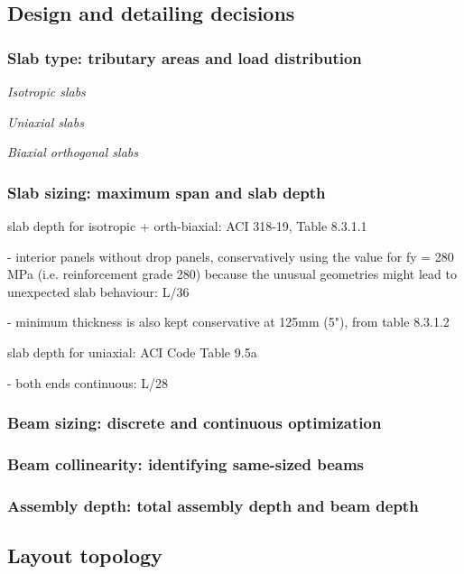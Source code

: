 \documentclass[10pt, letterpaper]{article} %
\begin{document}
    \subsection{Design and detailing decisions}\label{sec:design-decisions}

    \subsubsection{Slab type: tributary areas and load distribution}

    \textit{Isotropic slabs}

    \textit{Uniaxial slabs}

    \textit{Biaxial orthogonal slabs}

    \subsubsection{Slab sizing: maximum span and slab depth}

    slab depth for isotropic + orth-biaxial: ACI 318-19, Table 8.3.1.1
    
    - interior panels without drop panels, conservatively using the value for fy = 280 MPa (i.e. reinforcement grade 280) because the unusual geometries might lead to unexpected slab behaviour: L/36

    - minimum thickness is also kept conservative at 125mm (5"), from table 8.3.1.2

    slab depth for uniaxial: ACI Code Table 9.5a
    
    - both ends continuous: L/28

    \subsubsection{Beam sizing: discrete and continuous optimization}

    \subsubsection{Beam collinearity: identifying same-sized beams}

    \subsubsection{Assembly depth: total assembly depth and beam depth}

    \subsection{Layout topology}
\end{document}
